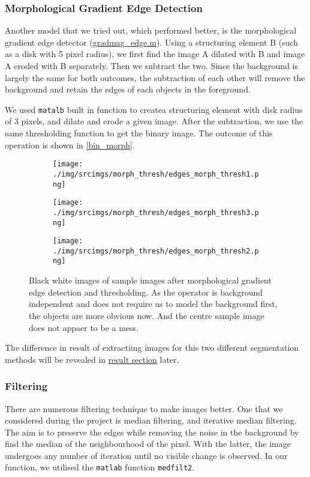 \documentclass[main.tex]{subfiles}
\begin{document}
\subsubsection*{Morphological Gradient Edge Detection}
Another model that we tried out, which performed better, is the morphological gradient edge detector (\hyperlink{gradmag}{gradmag\_edge.m}). Using a structuring element B (such as a disk with 5 pixel radius), we first find the  image A dilated with B and image A eroded with B separately. Then we subtract the two. Since the background is largely the same for both outcomes, the subtraction of each other will remove the background and retain the edges of each objects in the foreground.

We used \texttt{matalb} built in function to createa structuring element with disk radius of 3 pixels, and dilate and erode a given image. After the subtraction, we use the same thresholding function to get the binary image. The outcome of this operation is shown in \autoref{bin_morph}.

\begin{figure}[!h]
  \centering
  \begin{subfigure}[b]{.3\textwidth}
    \centering
    \texttt{[image: ./img/srcimgs/morph\_thresh/edges\_morph\_thresh1.png]}
  \end{subfigure}
  \begin{subfigure}[b]{.3\textwidth}
    \centering
    \texttt{[image: ./img/srcimgs/morph\_thresh/edges\_morph\_thresh3.png]}
  \end{subfigure}
  \begin{subfigure}[b]{.3\textwidth}
    \centering
    \texttt{[image: ./img/srcimgs/morph\_thresh/edges\_morph\_thresh2.png]}
  \end{subfigure}
  \caption{Black white images of sample images after morphological gradient edge detection and thresholding. As the operator is background independent and does not require us to model the background first, the objects are more obvious now. And the centre sample image does not appaer to be a mess.}
  \label{bin_morph}
\end{figure}

The difference in result of extractiing images for this two different segmentation methods will be revealed in \hyperlink{result}{result section} later.

\subsubsection*{Filtering}
There are numerous filtering technique to make images better. One that we considered during the project is median filtering, and iterative median filtering. The aim is to preserve the edges while removing the noise in the background by find the median of the neighbourhood of the pixel. With the latter, the image undergoes any number of iteration until no visible change is observed. In our function, we utilised the \texttt{matlab} function \texttt{medfilt2}.
\end{document}
